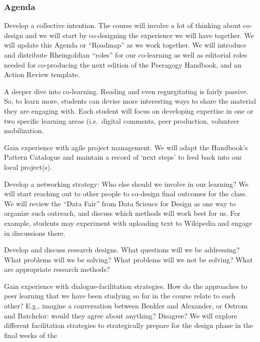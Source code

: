 \hypertarget{agenda}{%
\subsubsection{Agenda}\label{agenda}}

\begin{description}
\tightlist
\item[Wk 1: Introduction (Joe)]
Develop a collective intention. The course will involve a lot of
thinking about co-design and we will start by co-designing the
experience we will have together. We will update this Agenda or
``Roadmap'' as we work together. We will introduce and distribute
Rheingoldian ``roles'' for our co-learning as well as editorial roles
needed for co-producing the next edition of the Peeragogy Handbook, and
an Action Review template.
\item[Wk 2.]
A deeper dive into co-learning. Reading and even regurgitating is fairly
passive. So, to learn more, students can devise more interesting ways to
share the material they are engaging with. Each student will focus on
developing expertise in one or two specific learning areas (i.e.~digital
comments, peer production, volunteer mobilization.
\item[Wk 3]
Gain experience with agile project management. We will adapt the
Handbook's Pattern Catalogue and maintain a record of `next steps' to
feed back into our local project(s).
\item[Wk 4]
Develop a networking strategy: Who else should we involve in our
learning? We will start reaching out to other people to co-design final
outcomes for the class. We will review the ``Data Fair'' from Data
Science for Design as one way to organize such outreach, and discuss
which methods will work best for us. For example, students may
experiment with uploading text to Wikipedia and engage in discussions
there.
\item[Wk 5]
Develop and discuss research designs. What questions will we be
addressing? What problems will we be solving? What problems will we not
be solving? What are appropriate research methods?
\item[Wk 6]
Gain experience with dialogue-facilitation strategies. How do the
approaches to peer learning that we have been studying so far in the
course relate to each other? E.g., imagine a conversation between
Benkler and Alexander, or Ostrom and Batchelor: would they agree about
anything? Disagree? We will explore different facilitation strategies to
strategically prepare for the design phase in the final weeks of the

\end{description}
